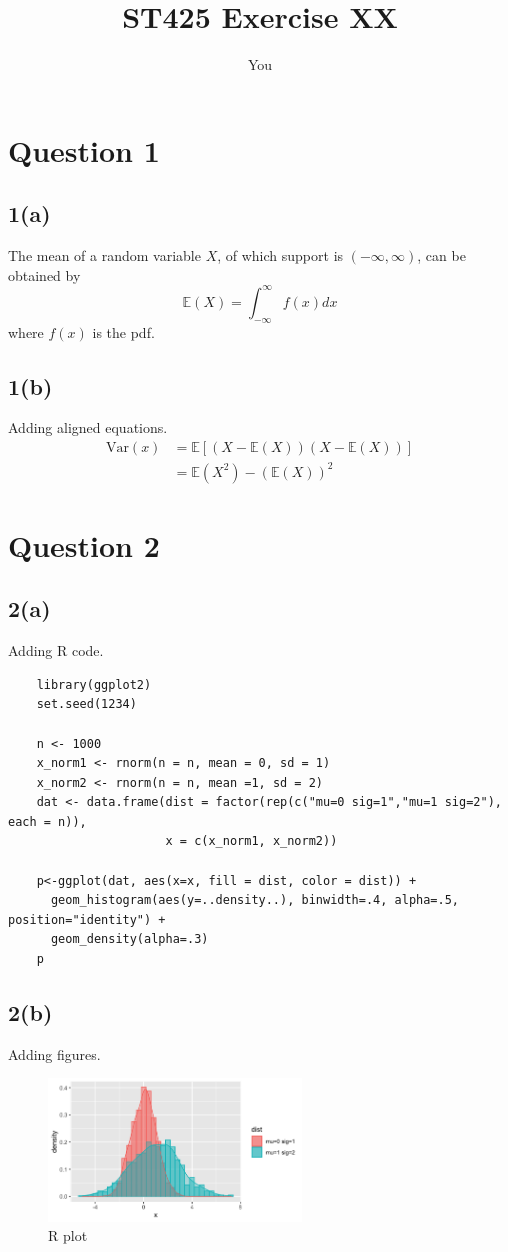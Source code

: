 \documentclass{article}
\title{ST425 Exercise XX}
\author{You}
\date{}
\begin{document}
\maketitle


\section*{Question 1}

\subsection*{1(a)}
The mean of a random variable $X$, of which support is $(-\infty,\infty)$, can be obtained by
\begin{equation*}
    \mathbb{E}(X) = \int_{-\infty}^{\infty}f(x)dx       
\end{equation*}
where $f(x)$ is the pdf.

\subsection*{1(b)}
Adding aligned equations. 
\begin{align*}
    \text{Var}(x) &= \mathbb{E}\left[(X-\mathbb{E}(X))(X-\mathbb{E}(X))\right] \\
                  &= \mathbb{E}(X^2) - \left(\mathbb{E}(X)\right)^2
\end{align*}


\newpage
\section*{Question 2}

\subsection*{2(a)} 
Adding R code.
\begin{lstlisting}
    library(ggplot2)
    set.seed(1234)
    
    n <- 1000
    x_norm1 <- rnorm(n = n, mean = 0, sd = 1)
    x_norm2 <- rnorm(n = n, mean =1, sd = 2)
    dat <- data.frame(dist = factor(rep(c("mu=0 sig=1","mu=1 sig=2"), each = n)),
                      x = c(x_norm1, x_norm2))
    
    p<-ggplot(dat, aes(x=x, fill = dist, color = dist)) +
      geom_histogram(aes(y=..density..), binwidth=.4, alpha=.5, position="identity") +
      geom_density(alpha=.3)
    p 
\end{lstlisting}

\subsection*{2(b)}
Adding figures.
\begin{figure}[h]
\centering
\includegraphics[width=0.6\textwidth]{Rplot.png}
\caption{R plot}
\label{fig:result}
\end{figure}
\end{document}
